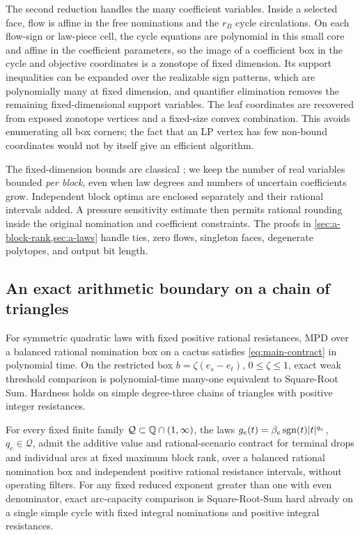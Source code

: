 The second reduction handles the many coefficient variables. Inside
a selected face, flow is affine in the free nominations and the
$r_B$ cycle circulations. On each flow-sign or law-piece cell, the
cycle equations are polynomial in this small core and affine in the
coefficient parameters, so the image of a coefficient box in the cycle
and objective coordinates is a zonotope of fixed dimension. Its support
inequalities can be expanded over the realizable sign patterns, which
are polynomially many at fixed dimension, and quantifier elimination
removes the remaining fixed-dimensional support variables. The leaf
coordinates are recovered from exposed zonotope vertices and a
fixed-size convex combination. This avoids enumerating all box corners;
the fact that an LP vertex has few non-bound coordinates would not by
itself give an efficient algorithm.

The fixed-dimension bounds are classical
\citep{renegar1992-on-the-computational-complexity-and,basu2006-algorithms-in-real-algebraic-geometry};
we keep the number of real variables bounded \emph{per block}, even
when law degrees and numbers of uncertain coefficients grow. Independent
block optima are enclosed separately and their rational intervals added.
A pressure sensitivity estimate then permits rational rounding inside
the original nomination and coefficient constraints. The proofs in
\cref{sec:a-block-rank,sec:a-laws} handle ties, zero flows, singleton
faces, degenerate polytopes, and output bit length.

\subsection{An exact arithmetic boundary on a chain of triangles}

\begin{theorem}
\label{thm:main-arithmetic}
For symmetric quadratic laws with fixed positive rational resistances,
MPD over a balanced rational nomination box on a cactus satisfies
\eqref{eq:main-contract} in polynomial time. On the restricted box
$b=\zeta(e_s-e_t)$, $0\le\zeta\le1$, exact weak threshold comparison
is polynomial-time many-one equivalent to Square-Root Sum. Hardness
holds on simple degree-three chains of triangles with positive integer
resistances.

For every fixed finite family $\mathcal Q\subset\mathbb{Q}\cap(1,\infty)$,
the laws $g_e(t)=\beta_e\operatorname{sgn}(t)|t|^{q_e}$, $q_e\in\mathcal Q$, admit
the additive value and rational-scenario contract for terminal drops
and individual arcs at fixed maximum block rank, over a balanced rational
nomination box and independent positive rational resistance intervals,
without operating filters. For any fixed reduced exponent greater than
one with even denominator, exact arc-capacity comparison is
Square-Root-Sum hard already on a single simple cycle with fixed integral
nominations and positive integral resistances.
\end{theorem}

